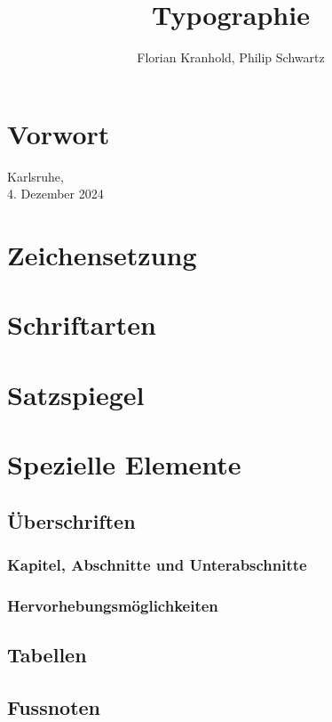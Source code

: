 \documentclass[ngerman]{scrbook}
\author{Florian Kranhold, Philip Schwartz}
\title {Typographie}
\begin{document}
\frontmatter


\chapter*{Vorwort}
\lipsum[1-2]

\begin{flushright}
  Karlsruhe,\\4. Dezember 2024
\end{flushright}

\mainmatter
\chapter{Zeichensetzung}
\lipsum

\chapter{Schriftarten}
\lipsum

\chapter{Satzspiegel}
\lipsum

\chapter{Spezielle Elemente}

\lipsum[1]

\section{Überschriften}

\lipsum[1]

\subsection{Kapitel, Abschnitte und Unterabschnitte}

\lipsum[2]

\subsection{Hervorhebungsmöglichkeiten}

\lipsum[3]

\section{Tabellen}

\lipsum[3]

\section{Fu\texorpdfstring{ss}{ß}noten}

\lipsum[4-6]
\end{document}
